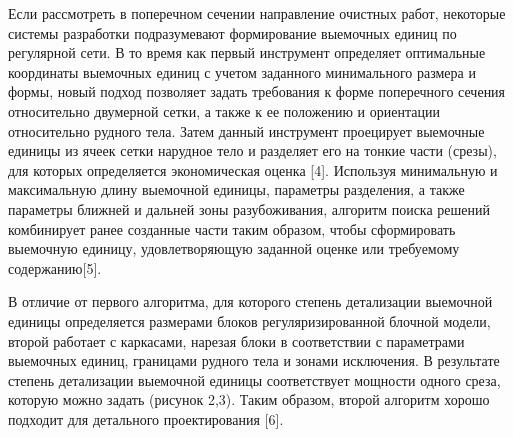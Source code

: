 \begin{multicols}{2}
Если рассмотреть в поперечном сечении направление очистных работ,
некоторые системы разработки подразумевают формирование выемочных единиц
по регулярной сети. В то время как первый инструмент определяет
оптимальные координаты выемочных единиц с учетом заданного минимального
размера и формы, новый подход позволяет задать требования к форме
поперечного сечения относительно двумерной сетки, а также к ее положению
и ориентации относительно рудного тела. Затем данный инструмент
проецирует выемочные единицы из ячеек сетки нарудное тело и разделяет
его на тонкие части (срезы), для которых определяется экономическая
оценка {[}4{]}. Используя минимальную и максимальную длину выемочной
единицы, параметры разделения, а также параметры ближней и дальней зоны
разубоживания, алгоритм поиска решений комбинирует ранее созданные части
таким образом, чтобы сформировать выемочную единицу, удовлетворяющую
заданной оценке или требуемому содержанию{[}5{]}.

В отличие от первого алгоритма, для которого степень детализации
выемочной единицы определяется размерами блоков регуляризированной
блочной модели, второй работает с каркасами, нарезая блоки в
соответствии с параметрами выемочных единиц, границами рудного тела и
зонами исключения. В результате степень детализации выемочной единицы
соответствует мощности одного среза, которую можно задать (рисунок 2,3).
Таким образом, второй алгоритм хорошо подходит для детального
проектирования {[}6{]}.
\end{multicols}

